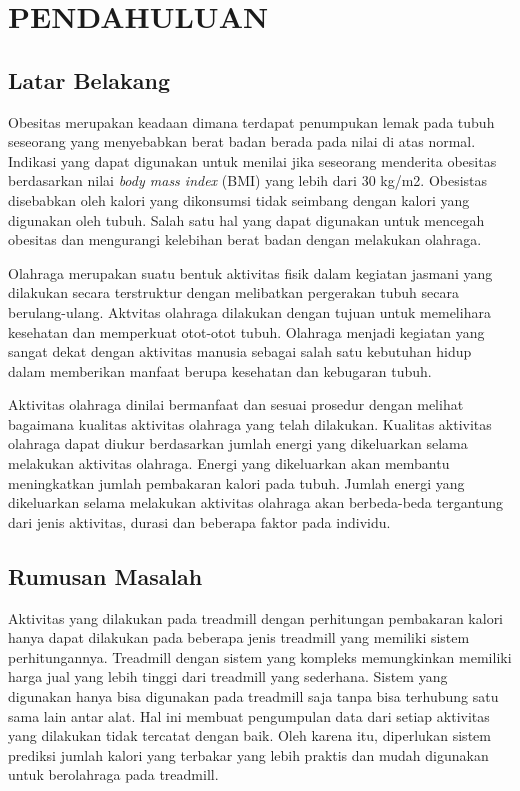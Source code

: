 \chapter{PENDAHULUAN}

\section{Latar Belakang}

Obesitas merupakan keadaan dimana terdapat penumpukan lemak pada tubuh seseorang yang menyebabkan berat badan berada pada nilai di atas normal. Indikasi yang dapat digunakan untuk menilai jika seseorang menderita obesitas berdasarkan nilai \emph{body mass index} (BMI) yang lebih dari 30 kg/m2. Obesistas disebabkan oleh kalori yang dikonsumsi tidak seimbang dengan kalori yang digunakan oleh tubuh. Salah satu hal yang dapat digunakan untuk mencegah obesitas dan mengurangi kelebihan berat badan dengan melakukan olahraga.

Olahraga merupakan suatu bentuk aktivitas fisik dalam kegiatan jasmani yang dilakukan secara terstruktur dengan melibatkan pergerakan tubuh secara berulang-ulang. Aktvitas olahraga dilakukan dengan tujuan untuk memelihara kesehatan dan memperkuat otot-otot tubuh. Olahraga menjadi kegiatan yang sangat dekat dengan aktivitas manusia sebagai salah satu kebutuhan hidup dalam memberikan manfaat berupa kesehatan dan kebugaran tubuh. 

Aktivitas olahraga dinilai bermanfaat dan sesuai prosedur dengan melihat bagaimana kualitas aktivitas olahraga yang telah dilakukan. Kualitas aktivitas olahraga dapat diukur berdasarkan jumlah energi yang dikeluarkan selama melakukan aktivitas olahraga. Energi yang dikeluarkan akan membantu meningkatkan jumlah pembakaran kalori pada tubuh. Jumlah energi yang dikeluarkan selama melakukan aktivitas olahraga akan berbeda-beda tergantung dari jenis aktivitas, durasi dan beberapa faktor pada individu.

\section{Rumusan Masalah}

Aktivitas yang dilakukan pada treadmill dengan perhitungan pembakaran kalori hanya dapat dilakukan pada beberapa jenis treadmill yang memiliki sistem perhitungannya. Treadmill dengan sistem yang kompleks memungkinkan memiliki harga jual yang lebih tinggi dari treadmill yang sederhana. Sistem yang digunakan hanya bisa digunakan pada treadmill saja tanpa bisa terhubung satu sama lain antar alat. Hal ini membuat pengumpulan data dari setiap aktivitas yang dilakukan tidak tercatat dengan baik. Oleh karena itu, diperlukan sistem prediksi jumlah kalori yang terbakar yang lebih praktis dan mudah digunakan untuk berolahraga pada treadmill. 

